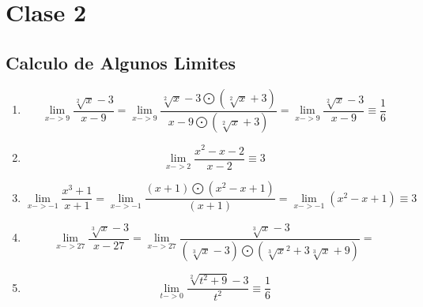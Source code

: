 \documentclass{article}
\begin{document}
\begin{enumerate}
            \end{enumerate}
        \section{Clase 2}
            \subsection{Calculo de Algunos Limites}
            \begin{enumerate}
                \item \begin{equation}
                    \lim_{x->9} \frac{\sqrt[2]{x}-3}{x-9} =
                    \lim_{x->9} \frac{\sqrt[2]{x}-3 \bigodot (\sqrt[2]{x} +3)}{x-9 \bigodot (\sqrt[2]{x} +3)}  =
                    \lim_{x->9} \frac{\sqrt[2]{x}-3}{x-9} \equiv \frac{1}{6}
                \end{equation}
                \item \begin{equation} \lim_{x->2} \frac{x^2-x-2}{x-2} \equiv 3
                \end{equation}
                \item \begin{equation}
                    \lim_{x->-1} \frac{x^3 +1}{x+1} = 
                    \lim_{x->-1} \frac{(x+1)\bigodot (x^2-x+1)}{(x+1)}=
                    \lim_{x->-1} (x^2-x+1) \equiv 3
                \end{equation}
                \item  \begin{equation}
                    \lim_{x->27} \frac{\sqrt[3]{x}-3}{x-27} =
                    \lim_{x->27} \frac{\sqrt[3]{x}-3}{(\sqrt[3]{x}-3) \bigodot (\sqrt[3]{x}^2 + 3\sqrt[3]{x}+9)} =
                \end{equation}
                \item  \begin{equation}
                    \lim_{t->0} \frac{\sqrt[2]{t^2 +9}-3}{t^2} \equiv \frac{1}{6}
                \end{equation}
            \end{enumerate}
\end{document}

